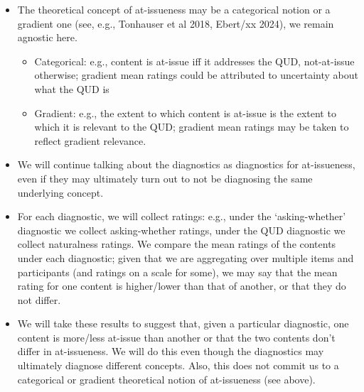 \documentclass[times,linguex,xcolor]{glossa}
\begin{document}
\begin{itemize}[leftmargin=12pt]
\begin{itemize}

\item The theoretical concept of at-issueness may be a categorical notion or a gradient one (see, e.g., Tonhauser et al 2018, Ebert/xx 2024), we remain agnostic here.

\begin{itemize}

\item Categorical: e.g., content is at-issue iff it addresses the QUD, not-at-issue otherwise; gradient mean ratings could be attributed to uncertainty about what the QUD is

\item Gradient: e.g., the extent to which content is at-issue is the extent to which it is relevant to the QUD; gradient mean ratings may be taken to reflect gradient relevance.

\end{itemize}

\item We will continue talking about the diagnostics as diagnostics for at-issueness, even if they may ultimately turn out to not be diagnosing the same underlying concept.

\item For each diagnostic, we will collect ratings: e.g., under the `asking-whether' diagnostic we collect asking-whether ratings, under the QUD diagnostic we collect naturalness ratings. We compare the mean ratings of the contents under each diagnostic; given that we are aggregating over multiple items and participants (and ratings on a scale for some), we may say that the mean rating for one content is higher/lower than that of another, or that they do not differ. 

\item We will take these results to suggest that, given a particular diagnostic, one content is more/less at-issue than another or that the two contents don't differ in at-issueness. We will do this even though the diagnostics may ultimately diagnose different concepts. Also, this does not commit us to a categorical or gradient theoretical notion of at-issueness (see above).

\end{itemize}

\end{itemize} 

\end{document}
